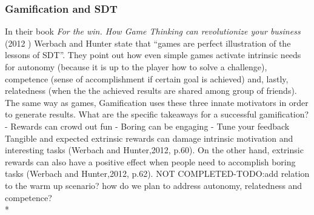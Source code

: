 \subsubsection{Gamification and SDT}
In their book \textit{For the win. How Game Thinking can revolutionize your business} (2012 )\cite{werbach2012win} Werbach and Hunter state that ``games are perfect illustration of the lessons of SDT''. They point out how even simple games activate intrinsic needs for autonomy (because it is up to the player how to solve a challenge), competence (sense of accomplishment if certain goal is achieved) and, lastly, relatedness (when the the achieved results are shared among group of friends). The same way as games, Gamification uses these three innate motivators in order to generate results.
What are the specific takeaways for a successful gamification?
- Rewards can crowd out fun
- Boring can be engaging
- Tune your feedback
Tangible and expected extrinsic rewards can damage intrinsic motivation and interesting tasks (Werbach and Hunter,2012, p.60). On the other hand, extrinsic rewards can also have a positive effect when people need to accomplish boring
tasks (Werbach and Hunter,2012, p.62).
NOT COMPLETED-TODO:add relation to the warm up scenario? how do we plan to address autonomy, relatedness and competence? 
\\*


